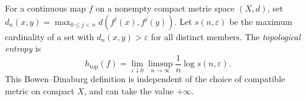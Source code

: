 
For a continuous map $f$ on a nonempty compact metric space $(X,d)$, set $d_n(x,y)=\max_{0\le j<n}d(f^j(x),f^j(y))$. Let $s(n,\varepsilon)$ be the maximum cardinality of a set with $d_n(x,y)>\varepsilon$ for all distinct members. The \emph{topological entropy} is
\[
h_{\mathrm{top}}(f)=\lim_{\varepsilon\downarrow0}\limsup_{n\to\infty}\frac1n\log s(n,\varepsilon).
\]
This Bowen--Dinaburg definition is independent of the choice of compatible metric on compact $X$, and can take the value $+\infty$.
